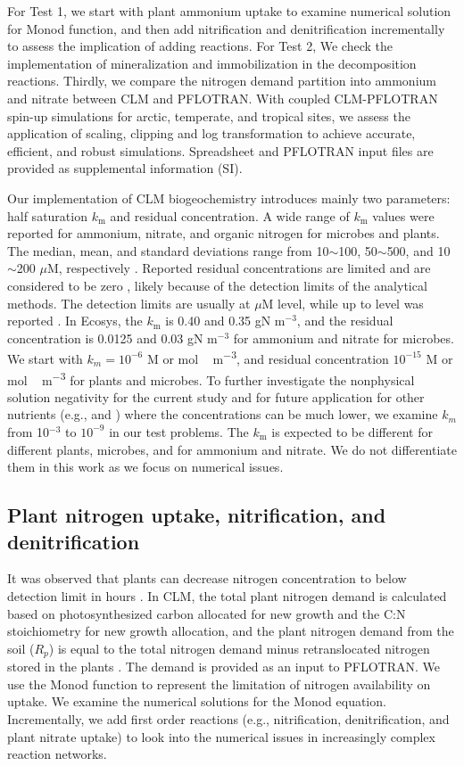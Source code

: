 \documentclass[gmd, manuscript]{copernicus}
\begin{document}
For Test 1, we start with plant ammonium uptake to examine numerical solution
for Monod function, and then add nitrification and denitrification
incrementally to assess the implication of adding reactions. For Test 2, We
check the implementation of mineralization and immobilization in the
decomposition reactions. Thirdly, we compare the nitrogen demand partition into
ammonium and nitrate between CLM and PFLOTRAN. With coupled CLM-PFLOTRAN
spin-up simulations for arctic, temperate, and tropical sites, we assess the
application of scaling, clipping and log transformation to achieve accurate,
efficient, and robust simulations. Spreadsheet and PFLOTRAN input files are
provided as supplemental information (SI).

Our implementation of CLM biogeochemistry introduces mainly two parameters:
half saturation $k_\text{m}$ and residual concentration. A wide range of
$k_\text{m}$ values were reported for ammonium, nitrate, and organic nitrogen
for microbes and plants. The median, mean, and standard deviations range from
10$\sim$100, 50$\sim$500, and 10$\sim$200 $\mu$M, respectively
\citep{Kuzyakov2013}. Reported residual concentrations are limited and are
considered to be zero \cite[e.g.,][]{Hogh1997}, likely because of the detection
limits of the analytical methods. The detection limits are usually at $\mu$M
level, while up to  level was reported \citep{Nollet2013}. In Ecosys,
the $k_\text{m}$ is 0.40 and 0.35 gN m$^{-3}$, and the residual concentration
is 0.0125 and 0.03 gN m$^{-3}$ \citep{Grant2013} for ammonium and nitrate for
microbes. We start with $k_m=10^{-6}$ \unit{M} or \unit{mol\,m^{-3}}, and
residual concentration $10^{-15}$ \unit{M} or \unit{mol\, m^{-3}} for plants
and microbes. To further investigate the nonphysical solution negativity for
the current study and for future application for other nutrients (e.g.,
 and ) where the concentrations can be much lower, we
examine $k_m$ from 10$^{-3}$ to $10^{-9}$ in our test problems. The
$k_\text{m}$ is expected to be different for different plants, microbes, and
for ammonium and nitrate. We do not differentiate them in this work as we focus
on numerical issues. 

\subsection{Plant nitrogen uptake, nitrification, and denitrification}
\label{sec:test1}
It was observed that plants can decrease nitrogen concentration to below
detection limit in hours \citep{Kamer2001}. 
In CLM, the total plant nitrogen demand is
calculated based on photosynthesized carbon allocated for new growth and the
C:N stoichiometry for new growth allocation, and the plant nitrogen demand from
the soil ($R_p$) is equal to the total nitrogen demand minus retranslocated nitrogen
stored in the plants  \citep{Oleson2013}. The demand is provided
as an input to PFLOTRAN. We use the
Monod function to represent the limitation of nitrogen availability on uptake.
We examine the numerical solutions for the Monod equation. Incrementally, we
add first order reactions (e.g., nitrification, denitrification, and plant
nitrate uptake) to look into the numerical issues in increasingly complex reaction networks. 
\end{document}

